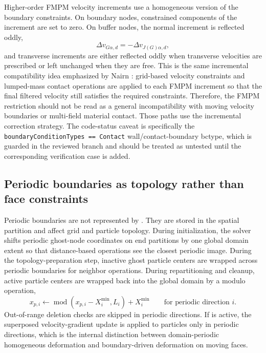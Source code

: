 Higher-order FMPM velocity increments use a homogeneous version of the boundary constraints.  On boundary nodes, constrained components of the increment are set to zero.  On buffer nodes, the normal increment is reflected oddly,
\begin{equation}
  \Delta v_{G\alpha,d}=-\Delta v_{J(G)\alpha,d},
\end{equation}
and transverse increments are either reflected oddly when transverse velocities are prescribed or left unchanged when they are free.  This is the same incremental compatibility idea emphasized by Nairn \cite{nairn2026fmpm}: grid-based velocity constraints and lumped-mass contact operations are applied to each FMPM increment so that the final filtered velocity still satisfies the required constraints.  Therefore, the FMPM restriction should not be read as a general incompatibility with moving velocity boundaries or multi-field material contact.  Those paths use the incremental correction strategy.  The code-status caveat is specifically the \texttt{boundaryConditionTypes == Contact} wall/contact-boundary bctype, which is guarded in the reviewed branch and should be treated as untested until the corresponding verification case is added.

\subsection{Periodic boundaries as topology rather than face constraints}
\label{subsec:bc-periodic-internals}

Periodic boundaries are not represented by .  They are stored in the spatial partition and affect grid and particle topology.  During initialization, the solver shifts periodic ghost-node coordinates on end partitions by one global domain extent so that distance-based operations see the closest periodic image.  During the topology-preparation step, inactive ghost particle centers are wrapped across periodic boundaries for neighbor operations.  During repartitioning and cleanup, active particle centers are wrapped back into the global domain by a modulo operation,
\begin{equation}
  x_{p,i}\leftarrow \operatorname{mod}(x_{p,i}-X_i^{\min},L_i)+X_i^{\min}
  \qquad\text{for periodic direction } i.
  \label{eq:bc-periodic-wrap}
\end{equation}
Out-of-range deletion checks are skipped in periodic directions.  If  is active, the superposed velocity-gradient update is applied to particles only in periodic directions, which is the internal distinction between domain-periodic homogeneous deformation and boundary-driven deformation on moving faces.
